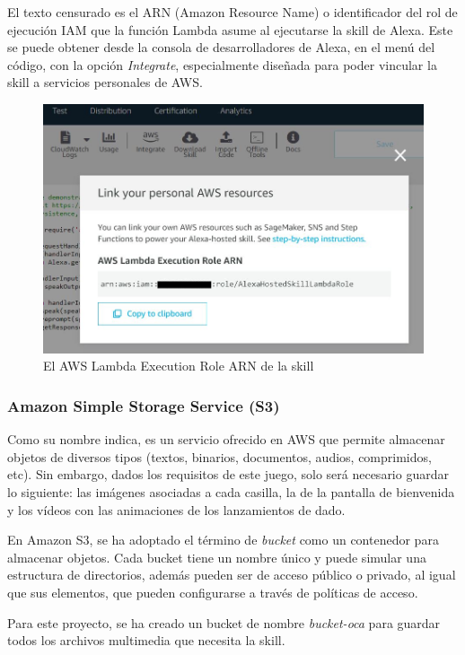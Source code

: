 El texto censurado es el ARN (Amazon Resource Name) o identificador del rol de ejecución IAM que la función Lambda asume al ejecutarse la skill de Alexa. Este se puede obtener desde la consola de desarrolladores de Alexa, en el menú del código, con la opción \textit{Integrate}, especialmente diseñada para poder vincular la skill a servicios personales de AWS.

\begin{figure}[H]
	\centering
	\includegraphics[width=1\textwidth]{imgs/aws-iam-4.png}
	\caption{El AWS Lambda Execution Role ARN de la skill}
	\label{fig:aws-iam-4}
\end{figure}

\subsubsection{Amazon Simple Storage Service (S3)}

Como su nombre indica, es un servicio ofrecido en AWS que permite almacenar objetos de diversos tipos (textos, binarios, documentos, audios, comprimidos, etc). Sin embargo, dados los requisitos de este juego, solo será necesario guardar lo siguiente: las imágenes asociadas a cada casilla, la de la pantalla de bienvenida y los vídeos con las animaciones de los lanzamientos de dado.

En Amazon S3, se ha adoptado el término de \textit{bucket} como un contenedor para almacenar objetos. Cada bucket tiene un nombre único y puede simular una estructura de directorios, además pueden ser de acceso público o privado, al igual que sus elementos, que pueden configurarse a través de políticas de acceso.

Para este proyecto, se ha creado un bucket de nombre \textit{bucket-oca} para guardar todos los archivos multimedia que necesita la skill.


